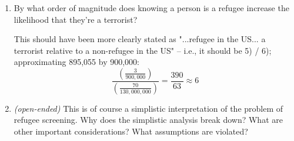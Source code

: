\documentclass{article}
\newenvironment{solution}{\color{red}}{\color{black}}
\begin{document}
\begin{enumerate}
\item By what order of magnitude does knowing a person is a refugee increase the likelihood that they're a terrorist?

\begin{solution}
This should have been more clearly stated as "...refugee in the US... a terrorist relative to a non-refugee in the US" -- i.e., it should be 5) / 6); approximating 895,055 by 900,000:
$$ \frac{\left( \frac{3}{900,000} \right)}{\left( \frac{70}{130,000,000} \right)} = \frac{390}{63} \approx 6 $$
\end{solution}

\item \textit{(open-ended)} This is of course a simplistic interpretation of the problem of refugee screening. Why does the simplistic analysis break down? What are other important considerations? What assumptions are violated?
\end{enumerate}
\end{document}
